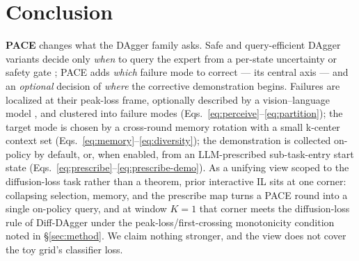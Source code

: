 \documentclass[letterpaper]{article} %
\begin{document}
\section{Conclusion}
\label{sec:conclusion}

\textbf{PACE} changes what the DAgger family asks. Safe and query-efficient DAgger
variants decide only \emph{when} to query the expert from a per-state uncertainty
or safety
gate \cite{zhang2017safedagger,menda2017dropoutdagger,menda2019ensembledagger,hoque2021thriftydagger,lee2025diffdagger};
PACE adds \emph{which} failure mode to correct --- its central axis --- and an
\emph{optional} decision of \emph{where} the corrective demonstration begins. Failures
are localized at their peak-loss frame, optionally described by a vision--language model
\cite{bai2025qwen3vl}, and clustered into
failure modes (Eqs.~\eqref{eq:perceive}--\eqref{eq:partition}); the target mode
is chosen by a cross-round memory rotation with a small k-center context set
(Eqs.~\eqref{eq:memory}--\eqref{eq:diversity}); the demonstration is collected
on-policy by default, or, when enabled, from an LLM-prescribed
\cite{yang2025qwen3} sub-task-entry start state
(Eqs.~\eqref{eq:prescribe}--\eqref{eq:prescribe-demo}). As a unifying view scoped to
the diffusion-loss task rather than a theorem, prior interactive IL sits at one
corner: collapsing selection, memory, and the prescribe map turns a PACE round
into a single on-policy query, and at window $K{=}1$ that corner meets the
diffusion-loss rule of Diff-DAgger \cite{lee2025diffdagger} under the
peak-loss/first-crossing monotonicity condition noted in
\S\ref{sec:method}. We claim nothing stronger, and the view does not cover the toy
grid's classifier loss.
\end{document}
